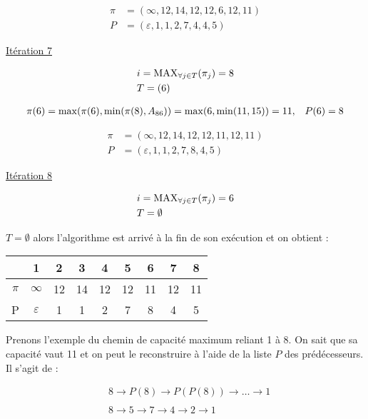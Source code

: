 \documentclass{article}
\begin{document}
\begin{align*}
  \pi &= (\infty,12,14,12,12,6,12,11)\\
  P &= (\varepsilon, 1, 1, 2, 7, 4, 4, 5)
\end{align*}

\underline{Itération 7}

\begin{align*}
  &i = \operatorname{MAX}_{\forall j \in T}(\pi_j) = 8\\
  &T = (6)
\end{align*}

\begin{align*}
  &\pi(6) = \operatorname{max}(\pi(6), \operatorname{min}(\pi(8), A_{86})) = \operatorname{max}(6, \operatorname{min}(11,15)) = 11, &P(6) = 8\\
\end{align*}

\begin{align*}
  \pi &= (\infty,12,14,12,12,11,12,11)\\
  P &= (\varepsilon, 1, 1, 2, 7, 8, 4, 5)
\end{align*}

\underline{Itération 8}

\begin{align*}
  &i = \operatorname{MAX}_{\forall j \in T}(\pi_j) = 6\\
  &T = \emptyset
\end{align*}

$T = \emptyset$ alors l'algorithme est arrivé à la fin de son
exécution et on obtient :

\begin{table}[H]

  \centering

  \begin{tabular}{c|cccccccc}
    
    & 1 & 2 & 3 & 4 & 5 & 6 & 7 & 8 \\
    \hline
    $\pi$ & $\infty$ & 12 & 14 & 12 & 12 & 11 & 12 & 11 \\
    P & $\varepsilon$ & 1 & 1 & 2 & 7 & 8 & 4 & 5 \\
  \end{tabular}

\end{table}

Prenons l'exemple du chemin de capacité maximum reliant 1 à 8. On sait
que sa capacité vaut 11 et on peut le reconstruire à l'aide de la
liste $P$ des prédécesseurs. Il s'agit de :

\begin{align*}
  &8 \rightarrow P(8) \rightarrow P(P(8)) \rightarrow \dots \rightarrow 1\\\\
  &8 \rightarrow 5 \rightarrow 7 \rightarrow 4 \rightarrow 2 \rightarrow 1
\end{align*}
\end{document}
